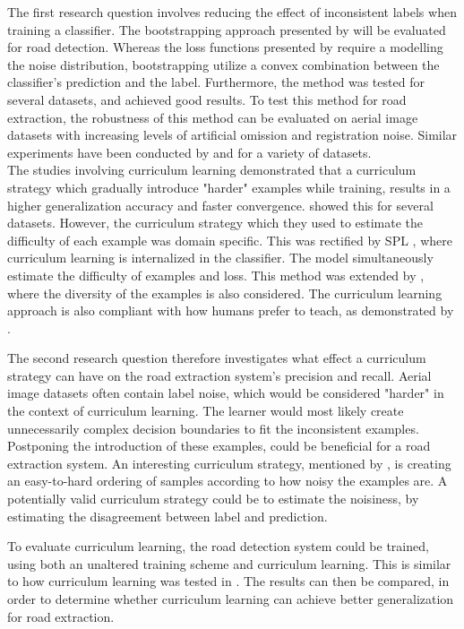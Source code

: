 The first research question involves reducing the effect of inconsistent labels when training a classifier. The bootstrapping approach presented by \cite{Reed_noisy_labels_bootstrapping} will be evaluated for road detection. Whereas the loss functions presented by \citep{Mnih_aerial_images_noisy} require a modelling the noise distribution,  bootstrapping utilize a convex combination between the classifier's prediction and the label. Furthermore, the method was tested for several datasets, and achieved good results. To test this method for road extraction, the robustness of this method can be evaluated on aerial image datasets with increasing levels of artificial omission and registration noise. Similar experiments have been conducted by \citep{Sukhbaatar_noisy_network_learning} and \citep{Reed_noisy_labels_bootstrapping} for a variety of datasets. \\

The studies involving curriculum learning demonstrated that a curriculum strategy which gradually introduce "harder" examples while training, results in a higher generalization accuracy and faster convergence. \citep{Bengio_curriculumlearning} showed this for several datasets. However, the curriculum strategy which they used to estimate the difficulty of each example was domain specific. This was rectified by \ac{SPL} \cite{Kumar_self_paced_learning}, where curriculum learning is internalized in the classifier. The model simultaneously estimate the difficulty of examples and loss. This method was extended by \citep{Lu_self-paced_learning_diversity}, where the diversity of the examples is also considered. The curriculum learning approach is also compliant with how humans prefer to teach, as demonstrated by \cite{Khan_human_teach}.

The second research question therefore investigates what effect a curriculum strategy can have on the road extraction system's precision and recall. Aerial image datasets often contain label noise, which would be considered "harder" in the context of curriculum learning. The learner would most likely create unnecessarily complex decision boundaries to fit the inconsistent examples. Postponing the introduction of these examples, could be beneficial for a road extraction system. An interesting curriculum strategy, mentioned by \cite{Bengio_curriculumlearning}, is creating an easy-to-hard ordering of samples according to how noisy the examples are. A potentially valid curriculum strategy could be to estimate the noisiness, by estimating the disagreement between label and prediction.

To evaluate curriculum learning, the road detection system could be trained, using both an unaltered training scheme and curriculum learning. This is similar to how curriculum learning was tested in \citep{Bengio_curriculumlearning}. The results can then be compared, in order to determine whether curriculum learning can achieve better generalization for road extraction.\\

